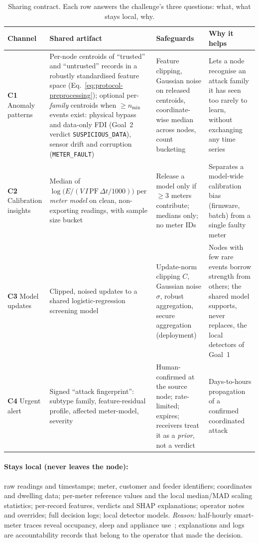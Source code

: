 \documentclass[11pt,a4paper]{article}
\newcommand{\code}[1]{\texttt{#1}}
\newcommand{\hdr}{\rowcolor{emblue!15}}
\begin{document}
\begin{table}[H]
\centering\small
\caption{Sharing contract. Each row answers the challenge's three questions: what, what stays local, why.}
\label{tab:sharing}
\begin{tabularx}{\textwidth}{@{}p{2.1cm} Y Y Y@{}}
\toprule\hdr
Channel & Shared artifact & Safeguards & Why it helps \\
\midrule
\textbf{C1} Anomaly patterns & Per-node centroids of ``trusted'' and ``untrusted'' records in a robustly standardised feature space (Eq.~\ref{eq:protocol-preprocessing}); optional per-\emph{family} centroids when $\ge n_{\min}$ events exist: physical bypass and data-only FDI (Goal~2 verdict \code{SUSPICIOUS\_DATA}), sensor drift and corruption (\code{METER\_FAULT}) & Feature clipping, Gaussian noise on released centroids, coordinate-wise median across nodes, count bucketing & Lets a node recognise an attack family it has seen too rarely to learn, without exchanging any time series \\
\addlinespace
\textbf{C2} Calibration insights & Median of $\log\!\big(E/(V\,I\,\mathrm{PF}\,\Delta t/1000)\big)$ per \emph{meter model} on clean, non-exporting readings, with sample size bucket & Release a model only if $\ge 3$ meters contribute; medians only; no meter IDs & Separates a model-wide calibration bias (firmware, batch) from a single faulty meter \\
\addlinespace
\textbf{C3} Model updates & Clipped, noised updates to a shared logistic-regression screening model & Update-norm clipping $C$, Gaussian noise $\sigma$, robust aggregation, secure aggregation (deployment) & Nodes with few rare events borrow strength from others; the shared model supports, never replaces, the local detectors of Goal~1 \\
\addlinespace
\textbf{C4} Urgent alert & Signed ``attack fingerprint'': subtype family, feature-residual profile, affected meter-model, severity & Human-confirmed at the source node; rate-limited; expires; receivers treat it as a \emph{prior}, not a verdict & Days-to-hours propagation of a confirmed coordinated attack \\
\bottomrule
\end{tabularx}
\end{table}

\paragraph{Stays local (never leaves the node):} raw readings and timestamps; meter, customer and feeder identifiers; coordinates and dwelling data; per-meter reference values and the local median/MAD scaling statistics; per-record features, verdicts and SHAP explanations; operator notes and overrides; full decision logs; local detector models. \emph{Reason:} half-hourly smart-meter traces reveal occupancy, sleep and appliance use~\cite{hart1992,molina2010}; explanations and logs are accountability records that belong to the operator that made the decision.
\end{document}
